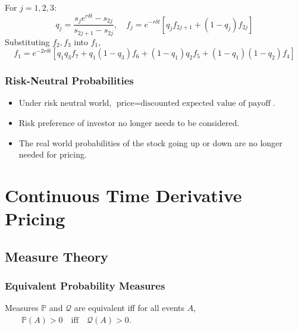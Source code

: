 \documentclass[11pt]{article}
\newcommand{\PR}{\mathbb{P}}
\newcommand{\Q}{\mathcal{Q}}
\begin{document}
\begin{center}
{
		}
		\end{center}
	For \( j = 1,2,3 \):
	\[	q_j = \frac{s_{j}e^{r\delta t} - s_{2j}}{s_{2j+1} - s_{2j}}, \quad
		f_{j} = e^{-r\delta t}\left[q_{j} f_{2j+1} + (1-q_{j})f_{2j}\right]
			\]
	Substituting \( f_2, f_3 \) into \( f_1 \),
	\[	f_1 = e^{-2r\delta t}\left[q_1q_3 f_7 + q_1 (1- q_3) f_6 + 
								  (1-q_1) q_2 f_5 + (1 - q_1)(1-q_2) f_4\right]
		\]
	\subsubsection{Risk-Neutral Probabilities}
	\begin{itemize}
		\item Under risk neutral world, \( \text{price} = \text{discounted expected value of payoff} \).
		\item Risk preference of investor no longer needs to be considered.
		\item The real world probabilities of the stock going up or down are no longer needed for pricing.
		\end{itemize}
	\newpage
	\section{Continuous Time Derivative Pricing}
	\subsection{Measure Theory}
	\subsubsection{Equivalent Probability Measures}
	Measures \( \PR \) and \( \Q \) are equivalent iff for all events \( A \), \(\qquad \PR(A)>0\quad\text{iff}\quad\Q(A)>0 \).
\end{document}

